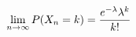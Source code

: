 \documentclass[preview]{standalone}
\begin{document}
\begin{align*}
\special{dvisvgm:raw <g id='unique000'>}\displaystyle\lim_{n\to\infty}P(X_n=k)=\frac{e^{-\lambda}\lambda^k}{k!}\special{dvisvgm:raw </g>}
\end{align*}
\end{document}
